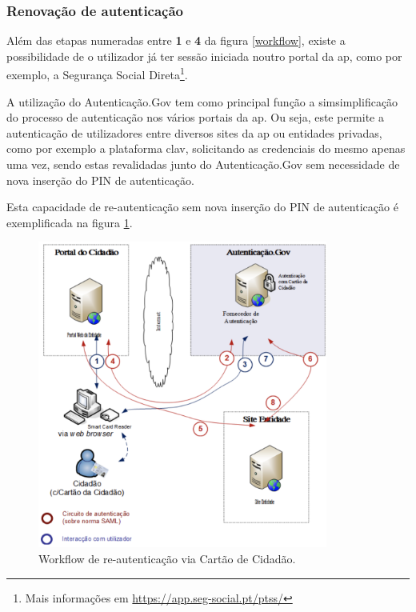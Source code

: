 \subsubsection{Renovação de autenticação} \label{renovacaoAuth}

Além das etapas numeradas entre \textbf{1} e \textbf{4} da figura \ref{workflow}, existe a possibilidade de o utilizador já ter sessão iniciada noutro portal da \gls{ap}, como por exemplo, a Segurança Social Direta\footnote{Mais informações em \url{https://app.seg-social.pt/ptss/}}.

A utilização do Autenticação.Gov tem como principal função a simsimplificação do processo de autenticação nos vários portais da \gls{ap}. Ou seja, este permite a autenticação de utilizadores entre diversos sites da \gls{ap} ou entidades privadas, como por exemplo a plataforma \gls{clav}, solicitando as credenciais do mesmo apenas uma vez, sendo estas revalidadas junto do Autenticação.Gov sem necessidade de nova inserção do PIN de autenticação.

Esta capacidade de re-autenticação sem nova inserção do PIN de autenticação é exemplificada na figura \ref{workflow2}.

\begin{figure}[h]
    \centering
    \includegraphics[width=0.85\textwidth]{img/authgov/workflow2.png}
    \caption{Workflow de re-autenticação via Cartão de Cidadão\cite{manualAuthGov}.}
    \label{workflow2}
\end{figure}

